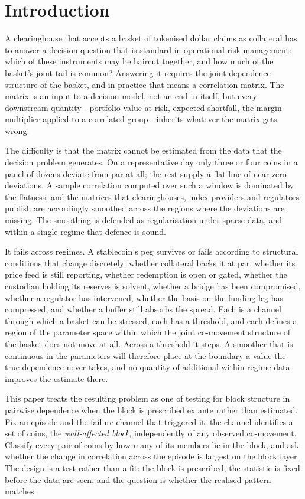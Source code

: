 
\section{Introduction}\label{sec:intro}
A clearinghouse that accepts a basket of tokenised dollar claims as collateral has to answer a decision question that is standard in operational risk management: which of these instruments may be haircut together, and how much of the basket's joint tail is common? Answering it requires the joint dependence structure of the basket, and in practice that means a correlation matrix. The matrix is an input to a decision model, not an end in itself, but every downstream quantity - portfolio value at risk, expected shortfall, the margin multiplier applied to a correlated group - inherits whatever the matrix gets wrong.

The difficulty is that the matrix cannot be estimated from the data that the decision problem generates. On a representative day only three or four coins in a panel of dozens deviate from par at all; the rest supply a flat line of near-zero deviations. A sample correlation computed over such a window is dominated by the flatness, and the matrices that clearinghouses, index providers and regulators publish are accordingly smoothed across the regions where the deviations are missing. The smoothing is defended as regularisation under sparse data, and within a single regime that defence is sound.

It fails across regimes. A stablecoin's peg survives or fails according to structural conditions that change discretely: whether collateral backs it at par, whether its price feed is still reporting, whether redemption is open or gated, whether the custodian holding its reserves is solvent, whether a bridge has been compromised, whether a regulator has intervened, whether the basis on the funding leg has compressed, and whether a buffer still absorbs the spread. Each is a channel through which a basket can be stressed, each has a threshold, and each defines a region of the parameter space within which the joint co-movement structure of the basket does not move at all. Across a threshold it steps. A smoother that is continuous in the parameters will therefore place at the boundary a value the true dependence never takes, and no quantity of additional within-regime data improves the estimate there.

This paper treats the resulting problem as one of testing for block structure in pairwise dependence when the block is prescribed ex ante rather than estimated. Fix an episode and the failure channel that triggered it; the channel identifies a set of coins, the \emph{wall-affected block}, independently of any observed co-movement. Classify every pair of coins by how many of its members lie in the block, and ask whether the change in correlation across the episode is largest on the block layer. The design is a test rather than a fit: the block is prescribed, the statistic is fixed before the data are seen, and the question is whether the realised pattern matches.

